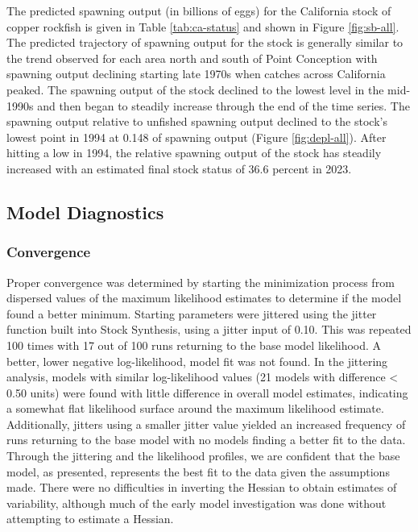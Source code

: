 \documentclass[11pt,
  english,
  letterpaper,
]{article}
\begin{document}
The predicted spawning output (in billions of eggs) for the California stock of copper rockfish is given in Table \ref{tab:ca-status} and shown in Figure \ref{fig:sb-all}. The predicted trajectory of spawning output for the stock is generally similar to the trend observed for each area north and south of Point Conception with spawning output declining starting late 1970s when catches across California peaked. The spawning output of the stock declined to the lowest level in the mid-1990s and then began to steadily increase through the end of the time series. The spawning output relative to unfished spawning output declined to the stock's lowest point in 1994 at 0.148 of spawning output (Figure \ref{fig:depl-all}). After hitting a low in 1994, the relative spawning output of the stock has steadily increased with an estimated final stock status of 36.6 percent in 2023.

\hypertarget{model-diagnostics}{%
\subsection{Model Diagnostics}\label{model-diagnostics}}

\hypertarget{convergence}{%
\subsubsection{Convergence}\label{convergence}}

Proper convergence was determined by starting the minimization process from dispersed values of the maximum likelihood estimates to determine if the model found a better minimum. Starting parameters were jittered using the jitter function built into Stock Synthesis, using a jitter input of 0.10. This was repeated 100 times with 17 out of 100 runs returning to the base model likelihood. A better, lower negative log-likelihood, model fit was not found. In the jittering analysis, models with similar log-likelihood values (21 models with difference \textless{} 0.50 units) were found with little difference in overall model estimates, indicating a somewhat flat likelihood surface around the maximum likelihood estimate. Additionally, jitters using a smaller jitter value yielded an increased frequency of runs returning to the base model with no models finding a better fit to the data. Through the jittering and the likelihood profiles, we are confident that the base model, as presented, represents the best fit to the data given the assumptions made. There were no difficulties in inverting the Hessian to obtain estimates of variability, although much of the early model investigation was done without attempting to estimate a Hessian.
\end{document}
